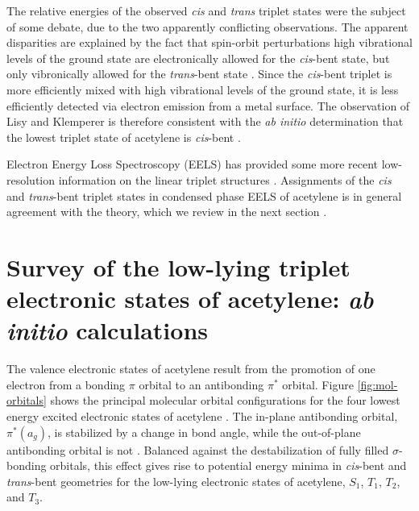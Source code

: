 \documentclass[12pt]{mitthesis}
\begin{document}
The relative energies of the observed \emph{cis} and \emph{trans}
triplet states were the subject of some debate, due to the two
apparently conflicting observations.  The apparent disparities are
explained by the fact that spin-orbit perturbations high vibrational
levels of the ground state are electronically allowed for the
\emph{cis}-bent state, but only vibronically allowed for the
\emph{trans}-bent state \cite{lundberg93}.  Since the \emph{cis}-bent
triplet is more efficiently mixed with high vibrational levels of the
ground state, it is less efficiently detected via electron emission
from a metal surface.  The observation of Lisy and Klemperer is
therefore consistent with the \emph{ab initio} determination that the
lowest triplet state of acetylene is \emph{cis}-bent
\cite{lundberg93}.

Electron Energy Loss Spectroscopy (EELS) has provided some more recent
low-resolution information on the linear triplet structures
\cite{dressler87, swiderek97}.  Assignments of the \emph{cis} and
\emph{trans}-bent triplet states in condensed phase EELS of acetylene
is in general agreement with the theory, which we review in the next
section \cite{malsch98}.


\section{Survey of the low-lying triplet electronic states of
  acetylene: \emph{ab initio} calculations}


The valence electronic states of acetylene result from the promotion
of one electron from a bonding $\pi$ orbital to an antibonding $\pi^*$
orbital.  Figure \ref{fig:mol-orbitals} shows the principal molecular
orbital configurations for the four lowest energy excited electronic
states of acetylene \cite{yamaguchi93}.  The in-plane antibonding
orbital, $\pi^*(a_g)$, is stabilized by a change in  bond
angle, while the out-of-plane antibonding orbital is not
\cite{walsh53, demoulin75, wetmore78}.  Balanced against the
destabilization of fully filled $\sigma$-bonding orbitals, this effect
gives rise to potential energy minima in \emph{cis}-bent and
\emph{trans}-bent geometries for the low-lying electronic states of
acetylene, $S_1$, $T_1$, $T_2$, and $T_3$.
\end{document}
